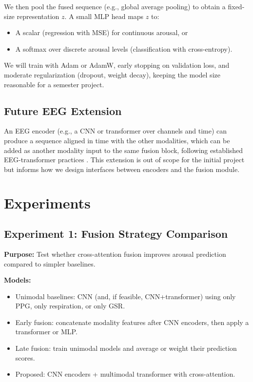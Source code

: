 \documentclass[11pt]{article}
\begin{document}
We then pool the fused sequence (e.g., global average pooling) to obtain a fixed-size representation $z$. A small MLP head maps $z$ to:
\begin{itemize}[leftmargin=1.4em]
  \item A scalar (regression with MSE) for continuous arousal, or
  \item A softmax over discrete arousal levels (classification with cross-entropy).
\end{itemize}

We will train with Adam or AdamW, early stopping on validation loss, and moderate regularization (dropout, weight decay), keeping the model size reasonable for a semester project.

\subsection{Future EEG Extension}
An EEG encoder (e.g., a CNN or transformer over channels and time) can produce a sequence aligned in time with the other modalities, which can be added as another modality input to the same fusion block, following established EEG-transformer practices \cite{li_spatial_2025,cheng_eeg-based_2024,chen_eeg-based_2024}. This extension is out of scope for the initial project but informs how we design interfaces between encoders and the fusion module.

\section{Experiments}
\subsection{Experiment 1: Fusion Strategy Comparison}
\textbf{Purpose:} Test whether cross-attention fusion improves arousal prediction compared to simpler baselines.

\textbf{Models:}
\begin{itemize}[leftmargin=1.4em]
  \item Unimodal baselines: CNN (and, if feasible, CNN+transformer) using only PPG, only respiration, or only GSR.
  \item Early fusion: concatenate modality features after CNN encoders, then apply a transformer or MLP.
  \item Late fusion: train unimodal models and average or weight their prediction scores.
  \item Proposed: CNN encoders + multimodal transformer with cross-attention.
\end{itemize}
\end{document}
